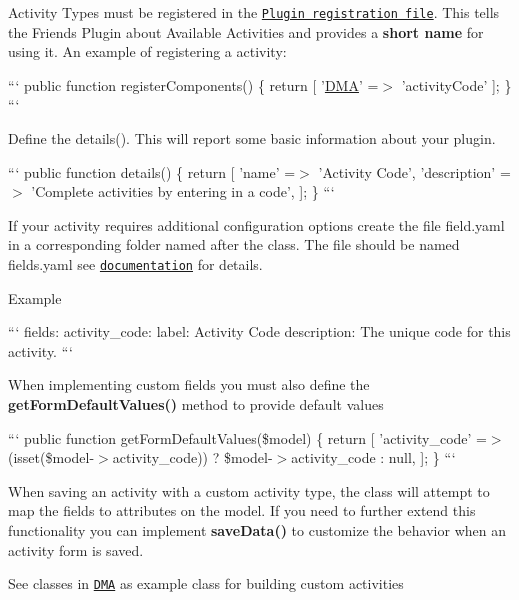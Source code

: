 Activity Types must be registered in the \href{#registration-file}{\tt Plugin registration file}. This tells the Friends Plugin about Available Activities and provides a {\bfseries short name} for using it. An example of registering a activity\+:

``` public function register\+Components() \{ return \mbox{[} '\hyperlink{namespaceDMA}{D\+M\+A}' =$>$ 'activity\+Code' \mbox{]}; \} ```

Define the details(). This will report some basic information about your plugin.

``` public function details() \{ return \mbox{[} 'name' =$>$ 'Activity Code', 'description' =$>$ 'Complete activities by entering in a code', \mbox{]}; \} ```

If your activity requires additional configuration options create the file field.\+yaml in a corresponding folder named after the class. The file should be named fields.\+yaml see \href{https://octobercms.com/docs/backend/forms#field-types}{\tt documentation} for details.

Example

``` fields\+: activity\+\_\+code\+: label\+: Activity Code description\+: The unique code for this activity. ```

When implementing custom fields you must also define the {\bfseries get\+Form\+Default\+Values()} method to provide default values

``` public function get\+Form\+Default\+Values(\$model) \{ return \mbox{[} 'activity\+\_\+code' =$>$ (isset(\$model-\/$>$activity\+\_\+code)) ? \$model-\/$>$activity\+\_\+code \+: null, \mbox{]}; \} ```

When saving an activity with a custom activity type, the class will attempt to map the fields to attributes on the model. If you need to further extend this functionality you can implement {\bfseries save\+Data()} to customize the behavior when an activity form is saved.

See classes in \href{https://github.com/DallasMuseumArt/OctoberFriends/tree/master/activities}{\tt D\+M\+A} as example class for building custom activities 